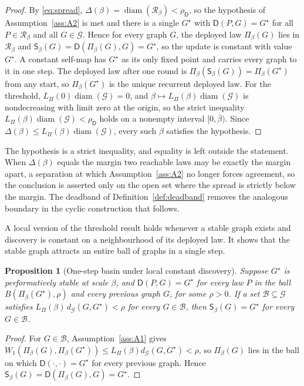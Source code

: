 \documentclass[11pt]{article}
\theoremstyle{plain}
\newtheorem{proposition}{Proposition}
\theoremstyle{definition}
\newcommand{\Gcal}{\mathcal{G}}
\newcommand{\Rset}{\mathcal{R}}
\newcommand{\Wone}{W_1}
\newcommand{\Dop}{\mathsf{D}}
\newcommand{\Pidep}{\Pi_\beta}
\newcommand{\Sbeta}{\mathsf{S}_\beta}
\newcommand{\diam}{\operatorname{diam}}
\begin{document}
\begin{proof}
By \eqref{eq:spread}, $\Delta(\beta)=\diam(\Rset_\beta)<\rho_\Dop$, so the hypothesis of Assumption~\ref{ass:A2} is met and there is a single $G^\star$ with $\Dop(P,G)=G^\star$ for all $P\in\Rset_\beta$ and all $G\in\Gcal$. Hence for every graph $G$, the deployed law $\Pidep(G)$ lies in $\Rset_\beta$ and $\Sbeta(G)=\Dop(\Pidep(G),G)=G^\star$, so the update is constant with value $G^\star$. A constant self-map has $G^\star$ as its only fixed point and carries every graph to it in one step. The deployed law after one round is $\Pidep(\Sbeta(G))=\Pidep(G^\star)$ from any start, so $\Pidep(G^\star)$ is the unique recurrent deployed law. For the threshold, $L_\Pi(0)\diam(\Gcal)=0$, and $\beta\mapsto L_\Pi(\beta)\diam(\Gcal)$ is nondecreasing with limit zero at the origin, so the strict inequality $L_\Pi(\beta)\diam(\Gcal)<\rho_\Dop$ holds on a nonempty interval $[0,\bar\beta)$. Since $\Delta(\beta)\le L_\Pi(\beta)\diam(\Gcal)$, every such $\beta$ satisfies the hypothesis.
\end{proof}

The hypothesis is a strict inequality, and equality is left outside the statement. When $\Delta(\beta)$ equals the margin two reachable laws may be exactly the margin apart, a separation at which Assumption~\ref{ass:A2} no longer forces agreement, so the conclusion is asserted only on the open set where the spread is strictly below the margin. The deadband of Definition~\ref{def:deadband} removes the analogous boundary in the cyclic construction that follows.

A local version of the threshold result holds whenever a stable graph exists and discovery is constant on a neighbourhood of its deployed law. It shows that the stable graph attracts an entire ball of graphs in a single step.

\begin{proposition}[One-step basin under local constant discovery]\label{thm:basin}
Suppose $G^\star$ is performatively stable at scale $\beta$, and $\Dop(P,G)=G^\star$ for every law $P$ in the ball $B(\Pidep(G^\star),\rho)$ and every previous graph $G$, for some $\rho>0$. If a set $\mathcal B\subseteq\Gcal$ satisfies $L_\Pi(\beta)\,d_\Gcal(G,G^\star)<\rho$ for every $G\in\mathcal B$, then $\Sbeta(G)=G^\star$ for every $G\in\mathcal B$.
\end{proposition}

\begin{proof}
For $G\in\mathcal B$, Assumption~\ref{ass:A1} gives $\Wone(\Pidep(G),\Pidep(G^\star))\le L_\Pi(\beta)d_\Gcal(G,G^\star)<\rho$, so $\Pidep(G)$ lies in the ball on which $\Dop(\cdot,\cdot)=G^\star$ for every previous graph. Hence $\Sbeta(G)=\Dop(\Pidep(G),G)=G^\star$.
\end{proof}
\end{document}
